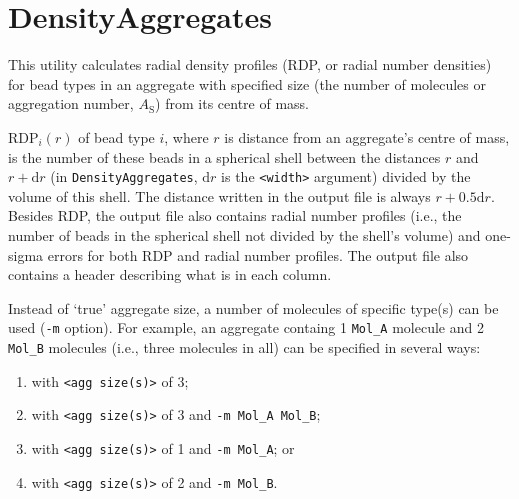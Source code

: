 \section{DensityAggregates} \label{sec:DensityAggregates}

This utility calculates radial density profiles (RDP, or radial number
densities) for bead types in an aggregate with specified size (the number
of molecules or aggregation number, $A_{\mathrm{S}}$) from its centre of
mass.

RDP$_i(r)$ of bead type $i$, where $r$ is distance from an aggregate's
centre of mass, is the number of these beads in a spherical shell between
the distances $r$ and $r+\mathrm{d}r$ (in \texttt{DensityAggregates},
$\mathrm{d}r$ is the \texttt{<width>} argument) divided by the volume of
this shell. The distance written in the output file is always
$r+0.5\mathrm{d}r$. Besides RDP, the output file also contains radial
number profiles (i.e., the number of beads in the spherical shell not
divided by the shell's volume) and one-sigma errors for both RDP and radial
number profiles. The output file also contains a header describing what is
in each column.

Instead of `true' aggregate size, a number of molecules of specific type(s)
can be used (\texttt{-m} option). For example, an aggregate containg 1
\texttt{Mol\_A} molecule and 2 \texttt{Mol\_B} molecules (i.e., three
molecules in all) can be specified in several ways:
\begin{enumerate}[nosep]
  \item  with \texttt{<agg size(s)>} of 3;
  \item  with \texttt{<agg size(s)>} of 3 and \texttt{-m Mol\_A Mol\_B};
  \item  with \texttt{<agg size(s)>} of 1 and \texttt{-m Mol\_A}; or
  \item  with \texttt{<agg size(s)>} of 2 and \texttt{-m Mol\_B}.
\end{enumerate}

